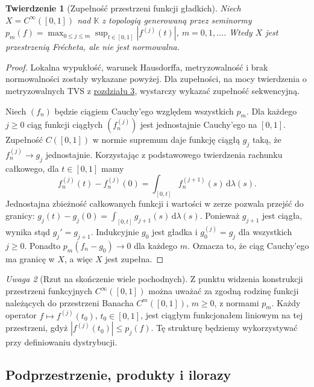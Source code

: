 \documentclass[11pt,a4paper]{article}
\numberwithin{equation}{section}
\theoremstyle{plain}
\newtheorem{twierdzenie}{Twierdzenie}[section]
\theoremstyle{definition}
\theoremstyle{remark}
\newtheorem{uwaga}[twierdzenie]{Uwaga}
\newcommand{\K}{\mathbb K}
\begin{document}
\begin{twierdzenie}[Zupełność przestrzeni funkcji gładkich]
\label{thm:smooth-complete}
Niech $X=C^\infty([0,1])$ nad $\K$ z topologią generowaną
przez seminormy $p_m(f)=\max_{0\le j\le m}
\sup_{t\in[0,1]}|f^{(j)}(t)|$, $m=0,1,\ldots$.
Wtedy $X$ jest przestrzenią Frécheta, ale nie jest normowalna.
\end{twierdzenie}
\begin{proof}
Lokalna wypukłość, warunek Hausdorffa, metryzowalność
i brak normowalności zostały wykazane powyżej.
Dla zupełności, na mocy twierdzenia o metryzowalnych
TVS z \hyperref[sec:zupelnosc]{rozdziału 3}, wystarczy wykazać zupełność sekwencyjną.

Niech $(f_n)$ będzie ciągiem Cauchy'ego względem wszystkich
$p_m$. Dla każdego $j\ge0$ ciąg funkcji ciągłych
$(f_n^{(j)})$ jest jednostajnie Cauchy'ego na $[0,1]$.
Zupełność $C([0,1])$ w normie supremum daje
funkcję ciągłą $g_j$ taką, że $f_n^{(j)}\to g_j$
jednostajnie. Korzystając z podstawowego twierdzenia
rachunku całkowego, dla $t\in[0,1]$ mamy
\[
 f_n^{(j)}(t)-f_n^{(j)}(0)
 =\int_{[0,t]}f_n^{(j+1)}(s)\,\mathrm d\lambda(s).
\]
Jednostajna zbieżność całkowanych funkcji i wartości
w zerze pozwala przejść do granicy:
$g_j(t)-g_j(0)=\int_{[0,t]}g_{j+1}(s)\,\mathrm d\lambda(s)$.
Ponieważ $g_{j+1}$ jest ciągła, wynika stąd
$g_j'=g_{j+1}$. Indukcyjnie $g_0$ jest gładka i
$g_0^{(j)}=g_j$ dla wszystkich $j\ge0$.
Ponadto $p_m(f_n-g_0)\to0$ dla każdego $m$.
Oznacza to, że ciąg Cauchy'ego ma granicę w $X$,
a więc $X$ jest zupełna.
\end{proof}

\begin{uwaga}[Rzut na skończenie wiele pochodnych]
Z punktu widzenia konstrukcji przestrzeni funkcyjnych
$C^\infty([0,1])$ można uważać za zgodną rodzinę
funkcji należących do przestrzeni Banacha $C^m([0,1])$,
$m\ge0$, z normami $p_m$. Każdy operator
$f\mapsto f^{(j)}(t_0)$, $t_0\in[0,1]$, jest ciągłym
funkcjonałem liniowym na tej przestrzeni, gdyż
$|f^{(j)}(t_0)|\le p_j(f)$. Tę strukturę będziemy
wykorzystywać przy definiowaniu dystrybucji.
\end{uwaga}

\subsection{Podprzestrzenie, produkty i ilorazy}
\end{document}
